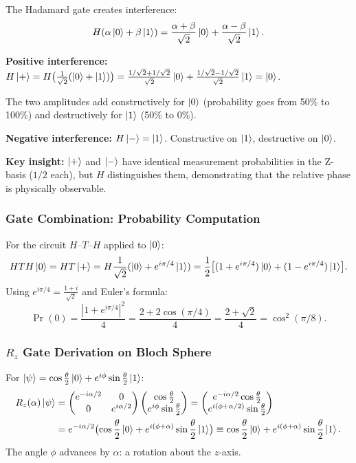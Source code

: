 \documentclass[10pt,a4paper]{article}
\begin{document}
The Hadamard gate creates interference:
\[
H(\alpha\ket{0}+\beta\ket{1})=\frac{\alpha+\beta}{\sqrt{2}}\ket{0}+\frac{\alpha-\beta}{\sqrt{2}}\ket{1}.
\]

\textbf{Positive interference:} $H\ket{+}=H\bigl(\frac{1}{\sqrt{2}}(\ket{0}+\ket{1})\bigr)=\frac{1/\sqrt{2}+1/\sqrt{2}}{\sqrt{2}}\ket{0}+\frac{1/\sqrt{2}-1/\sqrt{2}}{\sqrt{2}}\ket{1}=\ket{0}$.

The two amplitudes add constructively for $\ket{0}$ (probability goes from 50\% to 100\%) and destructively for $\ket{1}$ (50\% to 0\%).

\textbf{Negative interference:} $H\ket{-}=\ket{1}$. Constructive on $\ket{1}$, destructive on $\ket{0}$.

\textbf{Key insight:} $\ket{+}$ and $\ket{-}$ have identical measurement probabilities in the Z-basis ($1/2$ each), but $H$ distinguishes them, demonstrating that the relative phase is physically observable.

\subsubsection*{Gate Combination: Probability Computation}

For the circuit $H$--$T$--$H$ applied to $\ket{0}$:
\[
HTH\ket{0}=HT\ket{+}=H\frac{1}{\sqrt{2}}(\ket{0}+e^{i\pi/4}\ket{1})=\frac{1}{2}\bigl[(1+e^{i\pi/4})\ket{0}+(1-e^{i\pi/4})\ket{1}\bigr].
\]
Using $e^{i\pi/4}=\frac{1+i}{\sqrt{2}}$ and Euler's formula:
\[
\Pr(0)=\frac{|1+e^{i\pi/4}|^2}{4}=\frac{2+2\cos(\pi/4)}{4}=\frac{2+\sqrt{2}}{4}=\cos^2(\pi/8).
\]

\subsubsection*{$R_z$ Gate Derivation on Bloch Sphere}

For $\ket{\psi}=\cos\frac{\theta}{2}\ket{0}+e^{i\phi}\sin\frac{\theta}{2}\ket{1}$:
\begin{align*}
R_z(\alpha)\ket{\psi}&=\begin{pmatrix}e^{-i\alpha/2}&0\\0&e^{i\alpha/2}\end{pmatrix}\begin{pmatrix}\cos\frac{\theta}{2}\\e^{i\phi}\sin\frac{\theta}{2}\end{pmatrix}=\begin{pmatrix}e^{-i\alpha/2}\cos\frac{\theta}{2}\\e^{i(\phi+\alpha/2)}\sin\frac{\theta}{2}\end{pmatrix}\\
&=e^{-i\alpha/2}\bigl(\cos\frac{\theta}{2}\ket{0}+e^{i(\phi+\alpha)}\sin\frac{\theta}{2}\ket{1}\bigr)\equiv\cos\frac{\theta}{2}\ket{0}+e^{i(\phi+\alpha)}\sin\frac{\theta}{2}\ket{1}.
\end{align*}
The angle $\phi$ advances by $\alpha$: a rotation about the $z$-axis.
\end{document}
